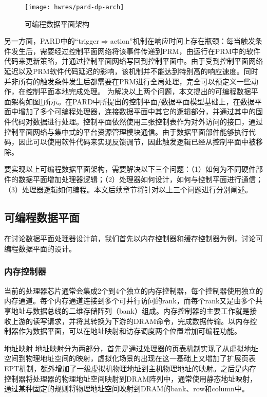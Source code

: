 \begin{figure}[tb]
  \centering
  \texttt{[image: hwres/pard-dp-arch]}
  \caption{可编程数据平面架构}
  \label{fig:pard-dp-arch}
\end{figure}

另一方面，PARD中的``trigger$\Rightarrow$action''机制在响应时间上存在瓶颈：每当触发条件发生后，需要经过控制平面网络将该事件传递到PRM，由运行在PRM中的软件代码来更新策略，并通过控制平面网络写回到控制平面中。由于受到控制平面网络延迟以及PRM软件代码延迟的影响，该机制并不能达到特别高的响应速度。同时并非所有的触发条件发生后都需要在PRM进行全局处理，完全可以预定义一些动作，在控制平面本地完成处理。
为解决以上两个问题，本文提出的可编程数据平面架构如图\ref{fig:pard-dp-arch}所示。在PARD中所提出的控制平面/数据平面模型基础上，在数据平面中增加了多个可编程处理器，连接数据平面中其它的逻辑部分，并通过其中的固件代码对数据进行处理。控制平面依然使用三张控制表作为对外访问的接口，通过控制平面网络与集中式的平台资源管理模块通信。由于数据平面部件能够执行代码，因此可以使用软件代码来实现反馈调节，因此触发逻辑已经从控制平面中被移除。
 
要实现以上可编程数据平面架构，需要解决以下三个问题：（1）如何为不同硬件部件的数据平面增加处理器逻辑；（2）处理器如何设计，如何与控制平面进行通信；（3）处理器逻辑如何编程。本文后续章节将针对以上三个问题进行分别阐述。

\subsection{可编程数据平面}

在讨论数据平面处理器设计前，我们首先以内存控制器和缓存控制器为例，讨论可编程数据平面的设计。

\subsubsection*{内存控制器}
当前的处理器芯片通常会集成2个到4个独立的内存控制器，每个控制器使用独立的内存通道。每个内存通道连接到多个可并行访问的rank，而每个rank又是由多个共享地址与数据总线的二维存储阵列（bank）组成。内存控制器的主要工作就是接收上游的读写请求，并将其转换为下游的DRAM命令，完成数据传输。以内存控制器作为数据平面，可以在地址映射和访存调度两个位置增加可编程功能。

地址映射 地址映射分为两部分，首先是通过处理器的页表机制实现了从虚拟地址空间到物理地址空间的映射，虚拟化场景的出现在这一基础上又增加了扩展页表EPT机制，额外增加了一级虚拟机物理地址到主机物理地址的映射。之后是内存控制器将处理器的物理地址空间映射到DRAM阵列中，通常使用静态地址映射，通过某种固定的规则将物理地址空间映射到DRAM的bank、row和column中。

